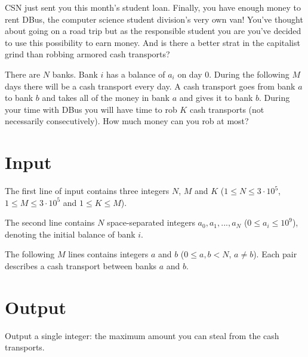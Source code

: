 \noindent
CSN just sent you this month's student loan. Finally, you have enough money to
rent DBus, the computer science student division's very own van! You've thought
about going on a road trip but as the responsible student you are you've decided
to use this possibility to earn money. And is there a better strat in the
capitalist grind than robbing armored cash transports?

There are $N$ banks. Bank $i$ has a balance of $a_i$ on day 0. During the
following $M$ days there will be a cash transport every day. A cash transport
goes from bank $a$ to bank $b$ and takes all of the money in bank $a$ and gives
it to bank $b$. During your time with DBus you will have time to rob $K$ cash
transports (not necessarily consecutively). How much money can you rob at most?

\section*{Input}

The first line of input contains three integers $N$, $M$ and $K$ ($1 \le N \le 3
\cdot 10^5$, $1 \le M \le 3 \cdot 10^5$ and $1 \le K \le M$).

\noindent The second line contains $N$ space-separated integers $a_0, a_1, ...,
a_N$ ($0 \le a_i \le 10^9$), denoting the initial balance of bank $i$.

\noindent The following $M$ lines contains integers $a$ and $b$ ($0 \le a, b <
N$, $a \neq b$).  Each pair describes a cash transport between banks $a$ and
$b$.

\section*{Output}

Output a single integer: the maximum amount you can steal from the cash
transports.
